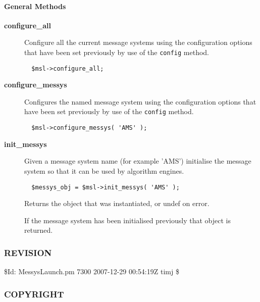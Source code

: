 \paragraph*{General Methods\label{ORAC::Msg::MessysLaunch_General_Methods}}
\begin{description}

\item[{\textbf{configure\_all}}] \mbox{}

Configure all the current message systems using the configuration
options that have been set previously by use of the \texttt{config}
method.

\begin{verbatim}
  $msl->configure_all;
\end{verbatim}

\item[{\textbf{configure\_messys}}] \mbox{}

Configures the named message system using the configuration
options that have been set previously by use of the \texttt{config}
method.

\begin{verbatim}
  $msl->configure_messys( 'AMS' );
\end{verbatim}

\item[{\textbf{init\_messys}}] \mbox{}

Given a message system name (for example 'AMS') initialise the
message system so that it can be used by algorithm engines.

\begin{verbatim}
  $messys_obj = $msl->init_messys( 'AMS' );
\end{verbatim}


Returns the object that was instantiated, or undef on error.



If the message system has been initialised previously that
object is returned.

\end{description}
\subsubsection*{REVISION\label{ORAC::Msg::MessysLaunch_REVISION}}


\$Id: MessysLaunch.pm 7300 2007-12-29 00:54:19Z timj \$

\subsubsection*{COPYRIGHT\label{ORAC::Msg::MessysLaunch_COPYRIGHT}}


